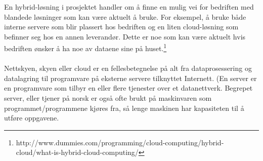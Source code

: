 En hybrid-løsning i prosjektet handler om å finne en mulig vei for bedriften med blandede løsninger som kan være aktuelt å bruke. For eksempel, å bruke både interne servere som blir plassert hos bedriften og en liten cloud-løsning som befinner seg hos en annen leverandør.
Dette er noe som kan være aktuelt hvis bedriften ønsker å ha noe av dataene sine på huset.\footnote{http://www.dummies.com/programming/cloud-computing/hybrid-cloud/what-is-hybrid-cloud-computing/}

\paragraph{} Nettskyen, skyen eller cloud er en fellesbetegnelse på alt fra dataprosessering og datalagring til programvare på eksterne servere tilknyttet Internett. (En server er en programvare som tilbyr en eller flere tjenester over et datanettverk. Begrepet server, eller tjener på norsk er også ofte brukt på maskinvaren som programmet/programmene kjøres fra, så lenge maskinen har kapasiteten til å utføre oppgavene.

